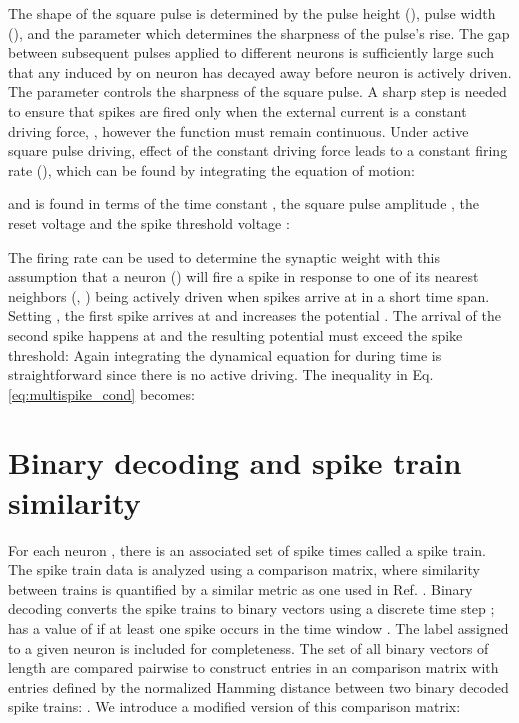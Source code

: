 \documentclass[sigconf]{acmart}
\begin{document}
The shape of the square pulse is determined by the pulse height (), pulse width (), and the parameter  which determines the sharpness of the pulse's rise. The gap between subsequent pulses applied to different neurons is sufficiently large such that any  induced by  on neuron  has decayed away before neuron  is actively driven. The parameter  controls the sharpness of the square pulse. A sharp step is needed to ensure that spikes are fired only when the external current is a constant driving force, , however the function  must remain continuous. Under active square pulse driving, effect of the constant driving force leads to a constant firing rate (), which can be found by integrating the equation of motion:

and is found in terms of the time constant , the square pulse amplitude , the reset voltage  and the spike threshold voltage :

The firing rate  can be used to determine the synaptic weight  with this assumption that a neuron () will fire a spike in response to one of its nearest neighbors (, ) being actively driven when  spikes arrive at  in a short time span.  Setting , the first spike arrives at  and increases the potential . The arrival of the second spike happens at  and the resulting potential must exceed the spike threshold: 
Again integrating the dynamical equation for   during time  is straightforward since there is no active driving. The inequality in Eq. \eqref{eq:multispike_cond} becomes:


\section{Binary decoding and spike train similarity} 
\label{sec:binary_code}
For each neuron , there is an associated set of spike times called a spike train. The spike train data is analyzed using a comparison matrix, where similarity between trains is quantified by a similar metric as one used in Ref. \cite{humphries2011spike}. Binary decoding converts the spike trains to binary vectors  using a discrete time step ;  has a value of  if at least one spike occurs in the time window . The label  assigned to a given neuron is included for completeness. The set of all  binary vectors of length  are compared pairwise to construct entries in an  comparison matrix  with entries  defined by the normalized Hamming distance between two binary decoded spike trains:  \cite{humphries2011spike}. We introduce a modified version of this comparison matrix:
\end{document}
